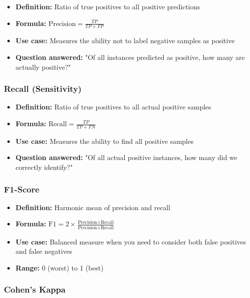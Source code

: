 \documentclass[12pt,a4paper]{article}
\begin{document}
\begin{itemize}
    \item \textbf{Definition:} Ratio of true positives to all positive predictions
    \item \textbf{Formula:} $\text{Precision} = \frac{TP}{TP + FP}$
    \item \textbf{Use case:} Measures the ability not to label negative samples as positive
    \item \textbf{Question answered:} "Of all instances predicted as positive, how many are actually positive?"
\end{itemize}

\subsubsection{Recall (Sensitivity)}

\begin{itemize}
    \item \textbf{Definition:} Ratio of true positives to all actual positive samples
    \item \textbf{Formula:} $\text{Recall} = \frac{TP}{TP + FN}$
    \item \textbf{Use case:} Measures the ability to find all positive samples
    \item \textbf{Question answered:} "Of all actual positive instances, how many did we correctly identify?"
\end{itemize}

\subsubsection{F1-Score}

\begin{itemize}
    \item \textbf{Definition:} Harmonic mean of precision and recall
    \item \textbf{Formula:} $\text{F1} = 2 \times \frac{\text{Precision} \times \text{Recall}}{\text{Precision} + \text{Recall}}$
    \item \textbf{Use case:} Balanced measure when you need to consider both false positives and false negatives
    \item \textbf{Range:} 0 (worst) to 1 (best)
\end{itemize}

\subsubsection{Cohen's Kappa}
\end{document}
